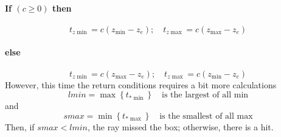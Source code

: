 \documentclass[11pt]{article}
\begin{document}
\paragraph{If $(c \geq 0)$ then}
\begin{equation}
	t_{z\min} = c(z_{\min} - z_e); \quad t_{z\max} = c(z_{\max} - z_e)
\end{equation}
\vspace{-3em}
\paragraph{else}
\begin{equation}
	t_{z\min} = c(z_{\max} - z_e); \quad t_{z\max} = c(z_{\min} - z_e)
\end{equation}
However, this time the return conditions requires a bit more calculations
\begin{equation}
	lmin = \max\left\{ t_{\ast\min} \right\} \quad \text{is the largest of all min}
\end{equation}
and 
\begin{equation}
	smax = \min\left\{ t_{\ast\max} \right\} \quad \text{is the smallest of all max}
\end{equation}
Then, if $smax < lmin$, the ray missed the box; otherwise, there is a hit. 
\end{document}

